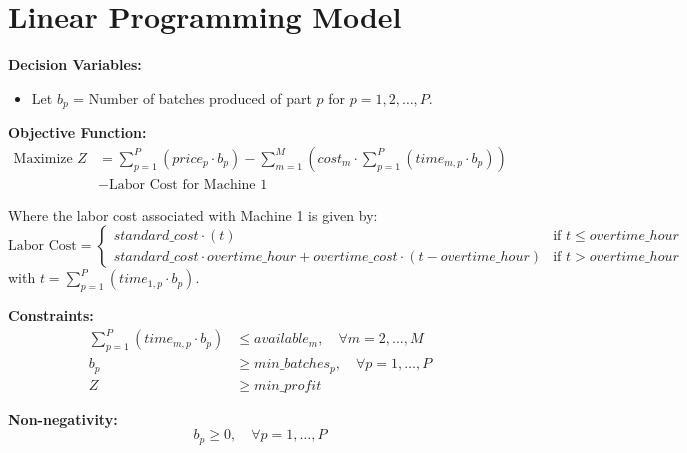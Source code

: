 \documentclass{article}
\begin{document}
\section*{Linear Programming Model}

\textbf{Decision Variables:}
\begin{itemize}
    \item Let \( b_p \) = Number of batches produced of part \( p \) for \( p = 1, 2, \ldots, P \).
\end{itemize}

\textbf{Objective Function:}
\begin{align*}
    \text{Maximize } Z & = \sum_{p=1}^{P} (price_p \cdot b_p) - \sum_{m=1}^{M} \left( cost_m \cdot \sum_{p=1}^{P} (time_{m,p} \cdot b_p) \right) \\
    & - \text{Labor Cost for Machine 1}
\end{align*}

Where the labor cost associated with Machine 1 is given by:
\[
\text{Labor Cost} = \begin{cases} 
standard\_cost \cdot (t) & \text{if } t \leq overtime\_hour \\
standard\_cost \cdot overtime\_hour + overtime\_cost \cdot (t - overtime\_hour) & \text{if } t > overtime\_hour 
\end{cases}
\]
with \( t = \sum_{p=1}^{P} (time_{1,p} \cdot b_p) \).

\textbf{Constraints:}
\begin{align*}
    \sum_{p=1}^{P} (time_{m,p} \cdot b_p) & \leq available_m, \quad \forall m = 2, \ldots, M \\
    b_p & \geq min\_batches_p, \quad \forall p = 1, \ldots, P \\
    Z & \geq min\_profit
\end{align*}

\textbf{Non-negativity:}
\[
b_p \geq 0, \quad \forall p = 1, \ldots, P
\]
\end{document}
